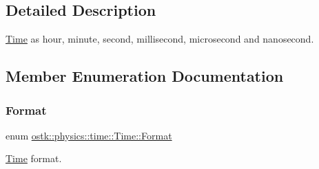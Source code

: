 \subsection{Detailed Description}
\hyperlink{classostk_1_1physics_1_1time_1_1_time}{Time} as hour, minute, second, millisecond, microsecond and nanosecond. 

\subsection{Member Enumeration Documentation}
\mbox{\label{classostk_1_1physics_1_1time_1_1_time_a207e776746c45c3aaffcf7112b2bc951}} 
\subsubsection{\texorpdfstring{Format}{Format}}
{\footnotesize\ttfamily enum \hyperlink{classostk_1_1physics_1_1time_1_1_time_a207e776746c45c3aaffcf7112b2bc951}{ostk\+::physics\+::time\+::\+Time\+::\+Format}\hspace{0.3cm}{\ttfamily [strong]}}



\hyperlink{classostk_1_1physics_1_1time_1_1_time}{Time} format. 

